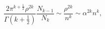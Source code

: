 \begin{equation}
\frac{2\pi^{k+\frac{1}{2}}\rho^{2k}}
{\Gamma(k+\frac{1}{2})}\frac{N_{k-1}}{N_{k}}
\sim \frac{\rho^{2k}}{n^{k}} 
\sim \alpha^{2k}n^{k}, 
\label{plancklength2ksphere}
\end{equation}


